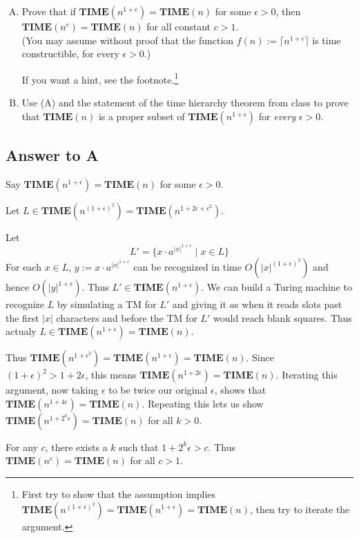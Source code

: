 \documentclass{article}
\newcommand{\TIME}{\mathbf{TIME}}
\begin{document}
	\begin{enumerate}[(A)]
		\item Prove that if $\TIME(n^{1+\epsilon})=\TIME(n)$ for some $\epsilon>0$, then $\TIME(n^c) = \TIME(n)$ for all constant $c >1$.\\ 
		(You may assume without proof that the function $f(n) := \lceil n^{1+\epsilon} \rceil$ is time constructible, for every $\epsilon > 0$.)
		
		If you want a hint, see the footnote.\footnote{\tiny First try to show that the assumption implies $\TIME(n^{(1+\epsilon)^2})=\TIME(n^{1+\epsilon}) = \TIME(n)$, then try to iterate the argument.}
		
		\item  Use (A) and the statement of the time hierarchy theorem from class to prove that $\TIME(n)$ is a proper subset of $\TIME(n^{1+\epsilon})$ for \emph{every} $\epsilon > 0$.
	\end{enumerate}
	
	\subsection*{Answer to A}
	Say $\TIME(n^{1+\epsilon}) = \TIME(n)$ for some $\epsilon > 0$.  

	Let $L \in \TIME(n^{(1 + \epsilon)^2}) = \TIME(n^{1 + 2\epsilon + \epsilon^2})$.

	Let
	$$
	L' = \{x \cdot a^{|x|^{1 + \epsilon}} \mid x \in L\}
	$$
	For each $x \in L$, $y := x \cdot a^{|x|^{1 + \epsilon}}$ can be recognized in time $O(|x|^{(1 + \epsilon)^2})$ and hence $O(|y|^{1 + \epsilon})$.  Thus $L' \in \TIME(n^{1 + \epsilon})$.
	We can build a Turing machine to recognize $L$ by simulating a TM for $L'$ and giving it $a$s when it reads slots past the first $|x|$ characters and before the TM for $L'$ would reach blank squares.  Thus actualy $L \in \TIME(n^{1 + \epsilon}) = \TIME(n)$.

	Thus $\TIME(n^{1 + \epsilon}^2) = \TIME(n^{1 + \epsilon}) = \TIME(n)$.  Since $(1 + \epsilon)^2 > 1 + 2 \epsilon$, this means $\TIME(n^{1 + 2 \epsilon}) = \TIME(n)$.  Iterating this argument, now taking $\epsilon$ to be twice our original $\epsilon$, shows that $\TIME(n^{1 + 4 \epsilon}) = \TIME(n)$.  Repeating this lets us show $\TIME(n^{1 + 2^k \epsilon}) = \TIME(n)$ for all $k > 0$.

	For any $c$, there exists a $k$ such that $1 + 2^k \epsilon > c$.  Thus $\TIME(n^c) = \TIME(n)$ for all $c > 1$.
\end{document}
